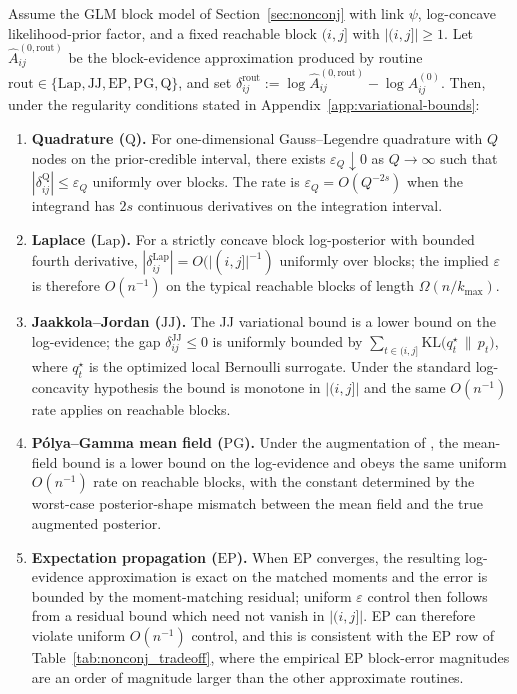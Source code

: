 \begin{proposition}
\label{prop:uniform-bounds}
Assume the GLM block model of Section~\ref{sec:nonconj} with link $\psi$, log-concave
likelihood-prior factor, and a fixed reachable block $(i,j]$ with $|(i,j]|\ge 1$. Let
$\widehat A^{(0,\mathrm{rout})}_{ij}$ be the block-evidence approximation produced by routine
$\mathrm{rout}\in\{\mathrm{Lap},\mathrm{JJ},\mathrm{EP},\mathrm{PG},\mathrm{Q}\}$, and set
$\delta^{\mathrm{rout}}_{ij}:=\log\widehat A^{(0,\mathrm{rout})}_{ij}-\log A^{(0)}_{ij}$. Then,
under the regularity conditions stated in Appendix~\ref{app:variational-bounds}:
\begin{enumerate}
\item \textbf{Quadrature ($\mathrm{Q}$).} For one-dimensional Gauss--Legendre quadrature with $Q$
nodes on the prior-credible interval, there exists $\varepsilon_Q\downarrow 0$ as $Q\to\infty$ such
that $|\delta^{\mathrm Q}_{ij}|\le \varepsilon_Q$ uniformly over blocks. The rate is $\varepsilon_Q=O(Q^{-2s})$ when the integrand has $2s$ continuous derivatives on the integration interval.
\item \textbf{Laplace ($\mathrm{Lap}$).} For a strictly concave block log-posterior with bounded
fourth derivative, $|\delta^{\mathrm{Lap}}_{ij}|=O(|(i,j]|^{-1})$ uniformly over blocks; the
implied $\varepsilon$ is therefore $O(n^{-1})$ on the typical reachable blocks of length $\Omega(n/k_{\max})$.
\item \textbf{Jaakkola--Jordan ($\mathrm{JJ}$).} The JJ variational bound is a lower bound on the
log-evidence; the gap $\delta^{\mathrm{JJ}}_{ij}\le 0$ is uniformly bounded by
$\sum_{t\in(i,j]} \mathrm{KL}\big(q^\star_t\,\|\,p_t\big)$, where $q^\star_t$ is the optimized
local Bernoulli surrogate. Under the standard log-concavity hypothesis the bound is monotone in
$|(i,j]|$ and the same $O(n^{-1})$ rate applies on reachable blocks.
\item \textbf{Pólya--Gamma mean field ($\mathrm{PG}$).} Under the augmentation of
\citet{polson2013pg}, the mean-field bound is a lower bound on the log-evidence and obeys the same
uniform $O(n^{-1})$ rate on reachable blocks, with the constant determined by the worst-case
posterior-shape mismatch between the mean field and the true augmented posterior.
\item \textbf{Expectation propagation ($\mathrm{EP}$).} When EP converges, the resulting log-evidence
approximation is exact on the matched moments and the error is bounded by the moment-matching
residual; uniform $\varepsilon$ control then follows from a residual bound which need not vanish in
$|(i,j]|$. EP can therefore violate uniform $O(n^{-1})$ control, and this is consistent with the
EP row of Table~\ref{tab:nonconj_tradeoff}, where the empirical EP block-error magnitudes are an
order of magnitude larger than the other approximate routines.
\end{enumerate}
\end{proposition}

